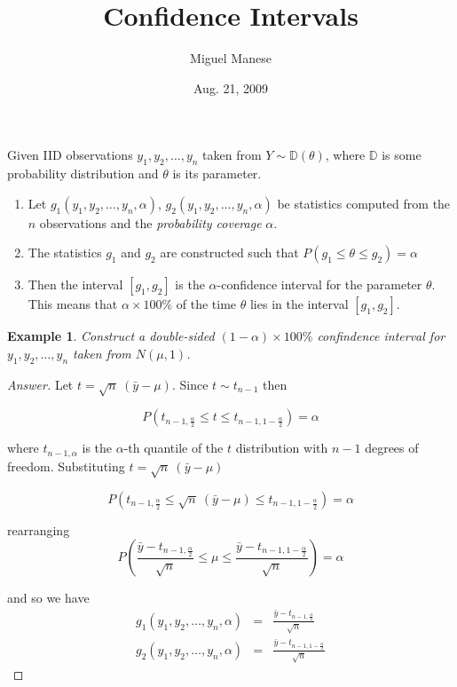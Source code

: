 \documentclass{article}
\title{Confidence Intervals}
\author{Miguel Manese}
\date{Aug. 21, 2009}
\newcommand{\obs}{y_{1}, y_{2}, \ldots, y_{n}}
\newtheorem{ex}{Example}
\begin{document}
\maketitle

\noindent Given IID observations $\obs$ taken
from $Y \sim \mathbb{D}(\theta)$, where $\mathbb{D}$ is some 
probability distribution and $\theta$ is its parameter.

\begin{enumerate}
\item Let $g_{1}(\obs, \alpha)$, $g_{2}(\obs, \alpha)$ be statistics
computed from the $n$ observations and the \textit{probability coverage}
$\alpha$.

\item The statistics $g_{1}$ and $g_{2}$ are constructed 
such that $P(g_{1} \leq \theta \leq g_{2}) = \alpha$ 

\item Then the interval $[g_{1}, g_{2}]$ is the $\alpha$-confidence interval
for the parameter $\theta$. This means that $\alpha \times 100\%$ of the 
time $\theta$ lies in the interval $[g_{1}, g_{2}]$.
\end{enumerate}

\begin{ex}
Construct a double-sided $(1 - \alpha) \times 100\%$ confindence interval for $\obs$ taken from $N(\mu, 1)$.
\end{ex}

\begin{proof}[Answer]
Let $t = \sqrt{n} \ (\bar{y} - \mu)$. Since $t \sim t_{n-1}$ then 

\[ P(t_{n-1, \frac{\alpha}{2}} \leq t \leq t_{n-1, 1 - \frac{\alpha}{2}}) = 
    \alpha \]

\noindent where $t_{n-1, \alpha}$ is the $\alpha$-th quantile of the $t$ 
distribution with $n-1$ degrees of freedom. Substituting 
$t = \sqrt{n} \ (\bar{y} - \mu)$

\[P(t_{n-1, \frac{\alpha}{2}} \leq \sqrt{n} \ (\bar{y} - \mu) \leq
     t_{n-1, 1 - \frac{\alpha}{2}}) = \alpha \]

\noindent rearranging
\[P\left(\frac{\bar{y} - t_{n-1, \frac{\alpha}{2}}}{\sqrt{n}} \leq \mu \leq
     \frac{\bar{y} - t_{n-1, 1 - \frac{\alpha}{2}}}{\sqrt{n}} \right) = \alpha \]

\noindent and so we have
\begin{eqnarray}
g_{1}(\obs,\alpha) & = & \frac{\bar{y} - t_{n-1, \frac{\alpha}{2}}}{\sqrt{n}}
 \nonumber \\ 
g_{2}(\obs,\alpha) & = & \frac{\bar{y} - t_{n-1, 1 - \frac{\alpha}{2}}}{\sqrt{n}} \nonumber
\end{eqnarray}
\end{proof}
\end{document}
